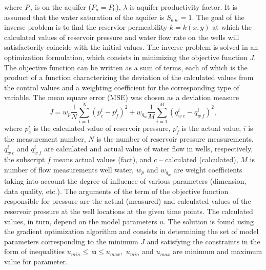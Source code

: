 \documentclass[
11pt,%
tightenlines,%
twoside,%
onecolumn,%
nofloats,%
nobibnotes,%
nofootinbib,%
superscriptaddress,%
noshowpacs,%
centertags]%
{revtex4}
\begin{document}
where $P_a$ is on the aquifer ($P_a = P_0$), $\lambda$ is
aquifer productivity factor. It is assumed that the water saturation
of the aquifer is $S_{a\:w} = 1$. The goal of the inverse problem is to find the reservior permeability  $k = k(x,y)$ at which the calculated values of reservoir pressure and water flow rate on the wells will satisfactorily coincide with the initial values.
The inverse problem is solved in an optimization
formulation, which consists in minimizing the objective function $J$.
The objective function can be written as a sum of terms, each of which
is the product of a function characterizing the deviation of the
calculated values from the control values and a weighting
coefficient for the corresponding type of variable. The mean square
error (MSE) was chosen as a deviation measure
\begin{equation} \label{mse}
J=w_p\frac{1}{N}\sum_{i=1}^N{\left(p_c^i-p_f^i\right)^2}+
w_{q_w}\frac{1}{M}\sum_{i=1}^M{\left(q_{w\:c}^i-q_{w\:f}^i\right)^2},
\end{equation}
where $p_c^i$ is the calculated value of reservoir pressure, $p_f^i$
is the actual value, $i$ is the measurement number, $N$ is the
number of reservoir pressure measurements, $q_{w\:c}^i$ and $
q_{w\:f}^i$ are calculated and actual value of water flow in wells,
respectively, the subscript $f$ means actual values (fact), and $c$
-- calculated (calculated), $M$ is number of flow measurements well
water, $w_p$ and $w_{q_w}$ are weight coefficients taking into
account the degree of influence of various parameters (dimension,
data quality, etc.). The arguments of the term of the objective
function responsible for pressure are the actual (measured) and
calculated values of the reservoir pressure at the well locations at
the given time points. The calculated values, in turn, depend on the
model parameters $u$. The solution is found using the gradient
optimization algorithm and consists in determining the set of model
parameters corresponding to the minimum $J$ and satisfying the
constraints in the form of inequalities
$
u_{min}\leq\ \boldsymbol{u}\leq u_{max},
$
$u_{min}$ and $u_{max}$ are minimum and maximum value for 
parameter.
\end{document}
